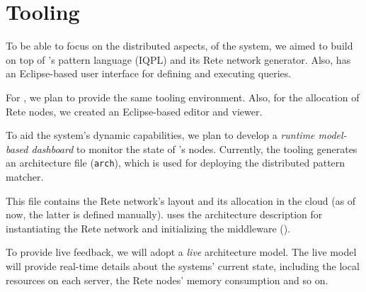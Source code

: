 \section{Tooling}

To be able to focus on the distributed aspects, of the system, we aimed to build \iqd{} on top of \eiq{}'s pattern language (IQPL) and its Rete network generator. Also, \eiq{} has an Eclipse-based user interface for defining and executing queries.

For \iqd{}, we plan to provide the same tooling environment. Also, for the allocation of Rete nodes, we created an Eclipse-based editor and viewer.



To aid the system's dynamic capabilities, we plan to develop a \emph{runtime model-based dashboard} to monitor the state of \iqd{}'s nodes. Currently, the \iqd{} tooling generates an architecture file (\texttt{arch}), which is used for deploying the distributed pattern matcher.

This file contains the Rete network's layout and its allocation in the cloud (as of now, the latter is defined manually). \iqd{} uses the architecture description for instantiating the Rete network and initializing the middleware ().


To provide live feedback, we will adopt a \emph{live} architecture model. The live model will provide real-time details about the systems' current state, including the local resources on each server, the Rete nodes' memory consumption and so on.



